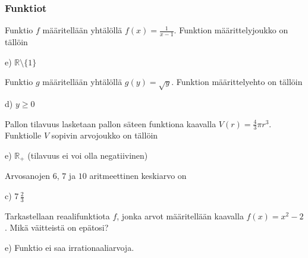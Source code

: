 \subsubsection*{Funktiot}
\begin{multicols}{2}

\begin{tehtava}
Funktio $f$ määritellään yhtälöllä $f(x)=\frac{1}{x-1}$. Funktion määrittelyjoukko on tällöin
    \begin{vastaus}
	 e) $\mathbb{R}\setminus \lbrace 1 \rbrace$
    \end{vastaus}
\end{tehtava}

\begin{tehtava}
Funktio $g$ määritellään yhtälöllä $g(y)=\sqrt{y}$. Funktion määrittelyehto on tällöin
    \begin{vastaus}
	 d) $y\geq 0$
    \end{vastaus}
\end{tehtava}

\begin{tehtava}
Pallon tilavuus lasketaan pallon säteen funktiona kaavalla $V(r)=\frac{4}{3}\pi r^3$. Funktiolle $V$ sopivin arvojoukko on tällöin
	\begin{vastaus}
	e) $\mathbb{R}_+$ (tilavuus ei voi olla negatiivinen)
	\end{vastaus}
\end{tehtava}

\begin{tehtava}
Arvosanojen $6$, $7$ ja $10$ aritmeettinen keskiarvo on
	\begin{vastaus}
	c) $7\,\frac{2}{3}$
	\end{vastaus}
\end{tehtava}

\begin{tehtava}
Tarkastellaan reaalifunktiota $f$, jonka arvot määritellään kaavalla $f(x)=x^2-2$. Mikä väitteistä on epätosi?
	\begin{vastaus}
	e) Funktio ei saa irrationaaliarvoja.
	\end{vastaus}
\end{tehtava}


\end{multicols}
